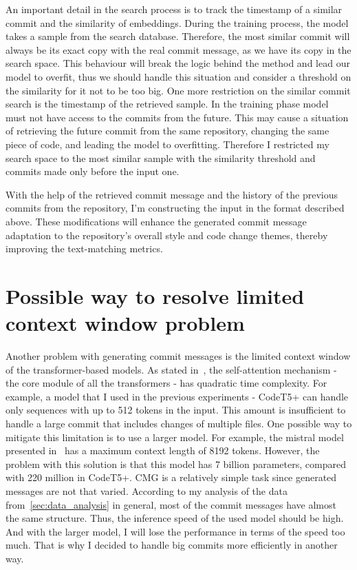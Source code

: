 An important detail in the search process is to track the timestamp of a similar commit and the similarity of embeddings.  During the training process, the model takes a sample from the search database. Therefore, the most similar commit will always be its exact copy with the real commit message, as we have its copy in the search space. This behaviour will break the logic behind the method and lead our model to overfit, thus we should handle this situation and consider a threshold on the similarity for it not to be too big. One more restriction on the similar commit search is the timestamp of the retrieved sample. In the training phase model must not have access to the commits from the future.  This may cause a situation of retrieving the future commit from the same repository, changing the same piece of code, and leading the model to overfitting. Therefore I restricted my search space to the most similar sample with the similarity threshold and commits made only before the input one.  

With the help of the retrieved commit message and the history of the previous commits from the repository, I'm constructing the input in the format described above. These modifications will enhance the generated commit message adaptation to the repository's overall style and code change themes, thereby improving the text-matching metrics.

\section{Possible way to resolve limited context window problem}\label{sec:file_attention_arch}
Another problem with generating commit messages is the limited context window of the transformer-based models.  As stated in~\cite{vaswani2017attention}, the self-attention mechanism {-} the core module of all the transformers {-} has quadratic time complexity. For example, a model that I used in the previous experiments {-} CodeT5+ can handle only sequences with up to 512 tokens in the input. This amount is insufficient to handle a large commit that includes changes of multiple files. One possible way to mitigate this limitation is to use a larger model. For example, the mistral model presented in~\cite{jiang2023mistral} has a maximum context length of 8192 tokens. However, the problem with this solution is that this model has 7 billion parameters, compared with 220 million in CodeT5+. 
CMG is a relatively simple task since generated messages are not that varied. According to my analysis of the data from~\ref{sec:data_analysis} in general, most of the commit messages have almost the same structure.    Thus, the inference speed of the used model should be high. And with the larger model, I will lose the performance in terms of the speed too much. That is why I decided to handle big commits more efficiently in another way.

